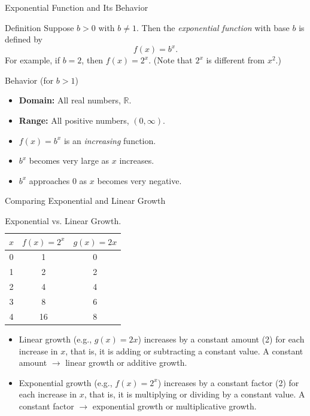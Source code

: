 \documentclass{beamer}
\begin{document}
\begin{frame}{Exponential Function and Its Behavior}
  \begin{block}{Definition}
    Suppose \(b>0\) with \(b\neq 1\). Then the \emph{exponential function} with base \(b\) is defined by
    \[
      f(x)=b^x.
    \]
    For example, if \(b=2\), then \(f(x)=2^x\). (Note that \(2^x\) is different from \(x^2\).)
  \end{block}
  \vspace{0.5em}
  \begin{block}{Behavior (for \(b>1\))}
    \begin{itemize}
      \item \textbf{Domain:} All real numbers, \(\mathbb{R}\).
      \item \textbf{Range:} All positive numbers, \((0,\infty)\).
      \item \(f(x)=b^x\) is an \emph{increasing} function.
      \item \(b^x\) becomes very large as \(x\) increases.
      \item \(b^x\) approaches \(0\) as \(x\) becomes very negative.
    \end{itemize}
  \end{block}
\end{frame}

\begin{frame}{Comparing Exponential and Linear Growth}
  \begin{table}[ht]
    \centering
    \begin{tabular}{c|c|c}
      \(x\) & \(f(x)=2^x\) & \(g(x)=2x\) \\ \hline
      0 & 1 & 0 \\
      1 & 2 & 2 \\
      2 & 4 & 4 \\
      3 & 8 & 6 \\
      4 & 16 & 8 \\
    \end{tabular}
    \caption{Exponential vs. Linear Growth.}
  \end{table}
  \begin{itemize}
    \item Linear growth (e.g., \(g(x)=2x\)) increases by a constant amount (2) for each increase in \(x\), that is, it is adding or subtracting a constant value. A constant amount \( \rightarrow \) linear growth or additive growth.
    \item Exponential growth (e.g., \(f(x)=2^x\)) increases by a constant factor (2) for each increase in \(x\), that is, it is multiplying or dividing by a constant value. A constant factor \( \rightarrow \) exponential growth or multiplicative growth.
  \end{itemize}
\end{frame}
\end{document}
